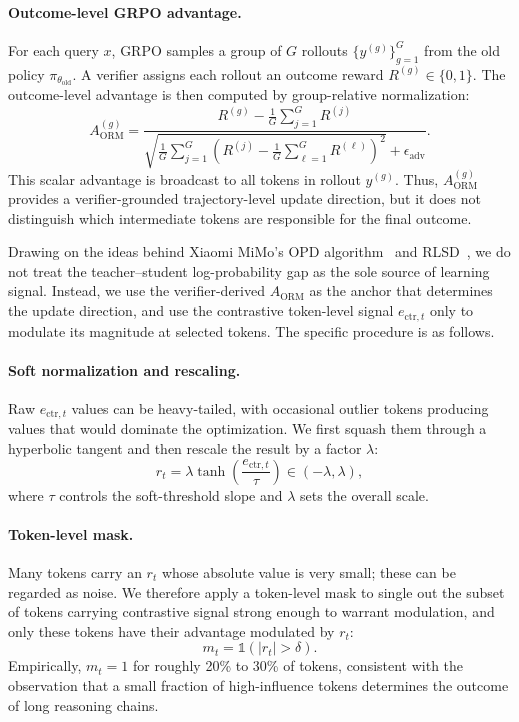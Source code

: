 \paragraph{Outcome-level GRPO advantage.}
For each query $x$, GRPO samples a group of $G$ rollouts
$\{y^{(g)}\}_{g=1}^{G}$ from the old policy $\pi_{\theta_{\text{old}}}$.
A verifier assigns each rollout an outcome reward
$R^{(g)} \in \{0,1\}$. The outcome-level advantage is then computed
by group-relative normalization:
\begin{equation}
\label{eq:aorm}
A_{\text{ORM}}^{(g)}
=
\frac{
R^{(g)} - \frac{1}{G}\sum_{j=1}^{G} R^{(j)}
}{
\sqrt{\frac{1}{G}\sum_{j=1}^{G}
\left(R^{(j)} - \frac{1}{G}\sum_{\ell=1}^{G} R^{(\ell)}\right)^2}
+ \epsilon_{\text{adv}}
}.
\end{equation}
This scalar advantage is broadcast to all tokens in rollout $y^{(g)}$.
Thus, $A_{\text{ORM}}^{(g)}$ provides a verifier-grounded trajectory-level
update direction, but it does not distinguish which intermediate tokens
are responsible for the final outcome.

Drawing on the ideas behind Xiaomi MiMo's OPD algorithm~\citep{xiao2026mimo} and RLSD~\citep{yang2026self}, we do not treat the teacher--student log-probability gap as the sole source of learning signal. Instead, we use the verifier-derived $A_{\text{ORM}}$ as the anchor that determines the update direction, and use the contrastive token-level signal $e_{\text{ctr},t}$ only to modulate its magnitude at selected tokens. The specific procedure is as follows.

\paragraph{Soft normalization and rescaling.}
Raw $e_{\text{ctr},t}$ values can be heavy-tailed, with occasional outlier tokens producing values that would dominate the optimization. We first squash them through a hyperbolic tangent and then rescale the result by a factor $\lambda$:
\begin{equation}
\label{eq:rt}
r_t = \lambda\tanh\!\left(\frac{e_{\text{ctr},t}}{\tau}\right) \in (-\lambda, \lambda),
\end{equation}
where $\tau$ controls the soft-threshold slope and $\lambda$ sets the overall scale.

\paragraph{Token-level mask.}
Many tokens carry an $r_t$ whose absolute value is very small; these can be regarded as noise. We therefore apply a token-level mask to single out the subset of tokens carrying contrastive signal strong enough to warrant modulation, and only these tokens have their advantage modulated by $r_t$:
\begin{equation}
\label{eq:mt}
m_t = \mathbb{1}(|r_t| > \delta).
\end{equation}
Empirically, $m_t = 1$ for roughly 20\% to 30\% of tokens, consistent with the observation that a small fraction of high-influence tokens determines the outcome of long reasoning chains.

